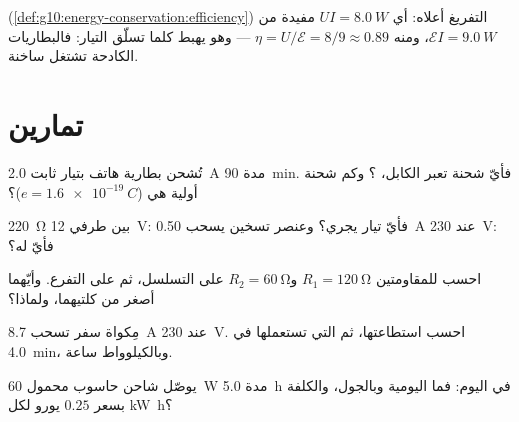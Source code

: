 \begin{example}\label{ex:g11:circuits-and-power:efficiency}
 (\cref{def:g10:energy-conservation:efficiency}) التفريغ
أعلاه: أي $UI = \qty{8.0}{W}$ مفيدة من $\mathcal{E}I =
\qty{9.0}{W}$، ومنه $\eta = U/\mathcal{E} = 8/9 \approx 0.89$ --- وهو يهبط
كلما تسلّق التيار: فالبطاريات الكادحة تشتغل ساخنة.
\end{example}

\section{تمارين}

\begin{exercise}[$\star$]\label{exo:g11:circuits-and-power:1}
تُشحن بطارية هاتف بتيار ثابت \qty{2.0}{A} مدة \qty{90}{min}. فأيّ
شحنة تعبر الكابل، ؟ وكم شحنة أولية هي
($e = \qty{1.6e-19}{C}$)؟
\end{exercise}

\begin{exercise}[$\star$]\label{exo:g11:circuits-and-power:2}
 \qty{220}{\ohm} بين طرفي \qty{12}{V}: فأيّ تيار يجري؟ وعنصر
تسخين يسحب \qty{0.50}{A} عند \qty{230}{V}: فأيّ  له؟
\end{exercise}

\begin{exercise}[$\star$]\label{exo:g11:circuits-and-power:3}
احسب  للمقاومتين $R_1 = \qty{120}{\ohm}$ و$R_2 =
\qty{60}{\ohm}$ على التسلسل، ثم على التفرع. وأيّهما أصغر من كلتيهما،
ولماذا؟
\end{exercise}

\begin{exercise}[$\star$]\label{exo:g11:circuits-and-power:4}
مِكواة سفر تسحب \qty{8.7}{A} عند \qty{230}{V}. احسب استطاعتها، ثم
 التي تستعملها في \qty{4.0}{min}،  وبالكيلوواط ساعة.
\end{exercise}

\begin{exercise}[$\star$]\label{exo:g11:circuits-and-power:5}
يوصّل شاحن حاسوب محمول \qty{60}{W} مدة \qty{5.0}{h} في اليوم: فما 
اليومية  وبالجول، والكلفة بسعر $0.25$ يورو لكل
\unit{kW.h}؟
\end{exercise}

